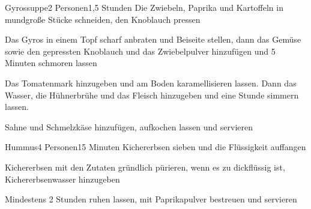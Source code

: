 
\begin{recipe}{Gyrossuppe}{2 Personen}{1,5 Stunden}
Die Zwiebeln, Paprika und Kartoffeln in mundgroße Stücke schneiden, den Knoblauch pressen

Das Gyros in einem Topf scharf anbraten und Beiseite stellen, dann das Gemüse sowie den gepressten Knoblauch und das Zwiebelpulver hinzufügen und 5 Minuten schmoren lassen

Das Tomatenmark hinzugeben und am Boden karamellisieren lassen. Dann das Wasser, die Hühnerbrühe und das Fleisch hinzugeben und eine Stunde simmern lassen.

Sahne und Schmelzkäse hinzufügen, aufkochen lassen und servieren
\end{recipe}


\begin{recipe}{Hummus}{4 Personen}{15 Minuten}
Kichererbsen sieben und die Flüssigkeit auffangen

Kichererbsen mit den Zutaten gründlich pürieren, wenn es zu dickflüssig ist, Kichererbsenwasser hinzugeben

Mindestens 2 Stunden ruhen lassen, mit Paprikapulver bestreuen und servieren
\end{recipe}


